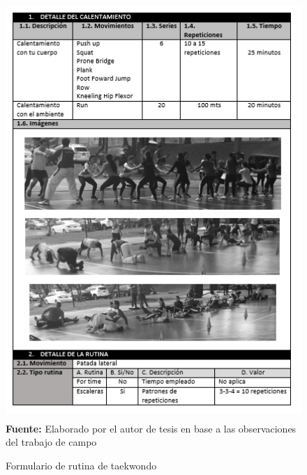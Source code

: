 \begin{figure}[H]
	\caption{Formulario de rutina de taekwondo}
	\label{fig:frmRoutTaek}
	\centering
	\includegraphics[width=445px,height=600px]{graphics/resultados/rutina-taekwondo.PNG} \\
	\textbf{Fuente:} Elaborado por el autor de tesis en base a las observaciones del trabajo de campo
\end{figure}
